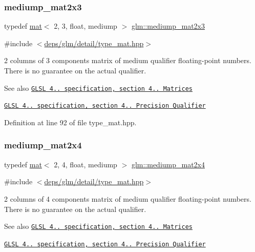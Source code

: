 \subsubsection{\texorpdfstring{mediump\+\_\+mat2x3}{mediump\_mat2x3}}
{\footnotesize\ttfamily typedef \hyperlink{structglm_1_1mat}{mat}$<$ 2, 3, float, mediump $>$ \hyperlink{group__core__precision_gae5003c3cea9aa152bf452223b7fd0fd5}{glm\+::mediump\+\_\+mat2x3}}



{\ttfamily \#include $<$\hyperlink{type__mat_8hpp}{deps/glm/detail/type\+\_\+mat.\+hpp}$>$}

2 columns of 3 components matrix of medium qualifier floating-\/point numbers. There is no guarantee on the actual qualifier.

\begin{DoxySeeAlso}{See also}
\href{http://www.opengl.org/registry/doc/GLSLangSpec.4.20.8.pdf}{\tt G\+L\+SL 4.. specification, section 4.. Matrices} 

\href{http://www.opengl.org/registry/doc/GLSLangSpec.4.20.8.pdf}{\tt G\+L\+SL 4.. specification, section 4.. Precision Qualifier} 
\end{DoxySeeAlso}


Definition at line 92 of file type\+\_\+mat.\+hpp.

\mbox{\label{group__core__precision_ga9778942a37cd364cc4129cbf423df429}} 
\subsubsection{\texorpdfstring{mediump\+\_\+mat2x4}{mediump\_mat2x4}}
{\footnotesize\ttfamily typedef \hyperlink{structglm_1_1mat}{mat}$<$ 2, 4, float, mediump $>$ \hyperlink{group__core__precision_ga9778942a37cd364cc4129cbf423df429}{glm\+::mediump\+\_\+mat2x4}}



{\ttfamily \#include $<$\hyperlink{type__mat_8hpp}{deps/glm/detail/type\+\_\+mat.\+hpp}$>$}

2 columns of 4 components matrix of medium qualifier floating-\/point numbers. There is no guarantee on the actual qualifier.

\begin{DoxySeeAlso}{See also}
\href{http://www.opengl.org/registry/doc/GLSLangSpec.4.20.8.pdf}{\tt G\+L\+SL 4.. specification, section 4.. Matrices} 

\href{http://www.opengl.org/registry/doc/GLSLangSpec.4.20.8.pdf}{\tt G\+L\+SL 4.. specification, section 4.. Precision Qualifier} 
\end{DoxySeeAlso}


